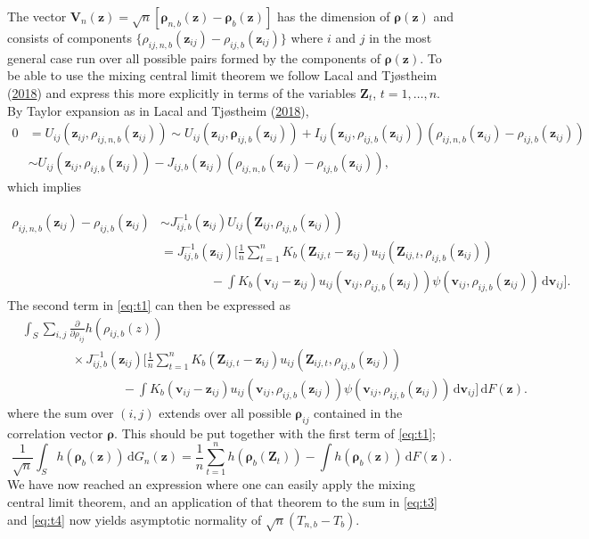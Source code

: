 \documentclass[
  12pt,
  letterpaper]{article}
\numberwithin{equation}{section}
\newcommand{\Z}{\bm{Z}}
\newcommand{\z}{\bm{z}}
\newcommand{\fv}{\bm{v}}
\newcommand{\fV}{\bm{V}}
\newcommand{\frho}{\bm{\rho}}
\newcommand{\di}{\,\textrm{d}}
\begin{document}
The vector \(\fV_n(\z) = \sqrt{n}[\frho_{n,b}(\z)-\frho_b(\z)]\) has the dimension of \(\frho(\z)\) and consists of components \(\{\rho_{ij,n,b}(\z_{ij})-\rho_{ij,b}(\z_{ij})\}\) where \(i\) and \(j\) in the most general case run over all possible pairs formed by the components of \(\frho(\z)\). To be able to use the mixing central limit theorem we follow Lacal and Tjøstheim (\protect\hyperlink{ref-lacal2018estimating}{2018}) and express this more explicitly in terms of the variables \(\Z_{t}\), \(t=1,\ldots,n\). By Taylor expansion as in Lacal and Tjøstheim (\protect\hyperlink{ref-lacal2018estimating}{2018}),
\begin{align*}
0 &= U_{ij}(\z_{ij},\rho_{ij,n,b}(\z_{ij})) \sim  U_{ij}(\z_{ij},\frho_{ij,b}(\z_{ij})) + I_{ij}(\z_{ij},\rho_{ij,b}(\z_{ij}))(\rho_{ij,n,b}(\z_{ij})-\rho_{ij,b}(\z_{ij})) \\
& \sim U_{ij}(\z_{ij},\rho_{ij,b}(\z_{ij})) - J_{ij,b}(\z_{ij})(\rho_{ij,n,b}(\z_{ij})-\rho_{ij,b}(\z_{ij})),
\end{align*}
which implies

\begin{align}
\rho_{ij,n,b}(\z_{ij}) - \rho_{ij,b}(\z_{ij}) & \sim J_{ij,b}^{-1}(\z_{ij})U_{ij}(\Z_{ij},\rho_{ij,b}(\z_{ij})) \nonumber \\
& = J_{ij,b}^{-1}(\z_{ij})\Big[\frac{1}{n}\sum_{t=1}^{n} K_b(\Z_{ij,t} - \z_{ij})u_{ij}(\Z_{ij,t},\rho_{ij,b}(\z_{ij})) \nonumber \\
& \qquad\qquad - \int K_b(\fv_{ij} - \z_{ij})u_{ij}(\fv_{ij},\rho_{ij,b}(\z_{ij}))\psi(\fv_{ij}, \rho_{ij,b}(\z_{ij})) \di \fv_{ij}\Big].
\label{eq:t2}
\end{align}
The second term in \eqref{eq:t1} can then be expressed as
\begin{align}
& \int_S \sum_{i,j} \frac{\partial}{\partial \rho_{ij}} h(\rho_{ij,b}(z)) \nonumber \\
& \qquad\qquad \times J_{ij,b}^{-1}(\z_{ij}) \Big[\frac{1}{n}\sum_{t=1}^{n} K_b(\Z_{ij,t}-\z_{ij})u_{ij}(\Z_{ij,t},\rho_{ij,b}(\z_{ij})) \nonumber \\
& \qquad\qquad\qquad\qquad- \int K_b(\fv_{ij}-\z_{ij})u_{ij}(\fv_{ij},\rho_{ij,b}(\z_{ij}))\psi(\fv_{ij},\rho_{ij,b}(\z_{ij})) \di \fv_{ij}\Big] \di F(\z).
\label{eq:t3}
\end{align}
where the sum over \((i,j)\) extends over all possible \(\frho_{ij}\) contained in the correlation vector \(\frho\). This should be put together with the first term of \eqref{eq:t1};
\begin{equation}
\frac{1}{\sqrt{n}} \int_S h(\frho_b(\z)) \di G_n(\z) = \frac{1}{n}\sum_{t=1}^{n}h\left(\frho_b(\Z_{t})\right) - \int h\left(\frho_b(\z)\right) \di F(\z).
\label{eq:t4}
\end{equation}
We have now reached an expression where one can easily apply the mixing central limit theorem, and an application of that theorem to the sum in \eqref{eq:t3} and \eqref{eq:t4} now yields asymptotic normality of \(\sqrt{n}\left(T_{n,b}-T_{b}\right)\).
\end{document}
